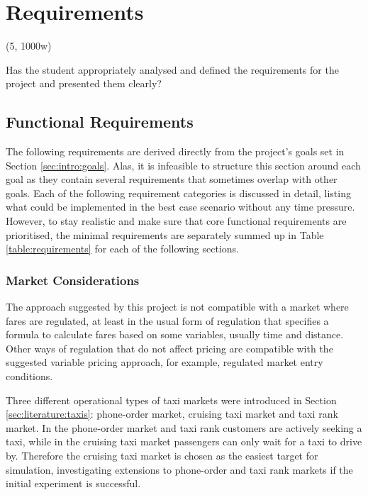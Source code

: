 \newpage
\section{Requirements}
\label{sec:requirements}

(5, 1000w)

Has the student appropriately analysed and defined the requirements for the
project and presented them clearly?


\subsection{Functional Requirements}
\label{sec:requirements:simulation}

The following requirements are derived directly from the project's goals set in
Section \ref{sec:intro:goals}. Alas, it is infeasible to structure this section
around each goal as they contain several requirements that sometimes overlap
with other goals. Each of the following requirement categories is discussed in
detail, listing what could be implemented in the best case scenario without any
time pressure. However, to stay realistic and make sure that core functional
requirements are prioritised, the minimal requirements are separately summed up
in Table \ref{table:requirements} for each of the following sections.


\subsubsection{Market Considerations}

The approach suggested by this project is not compatible with a market where
fares are regulated, at least in the usual form of regulation that specifies a
formula to calculate fares based on some variables, usually time and distance.
Other ways of regulation that do not affect pricing are compatible with the
suggested variable pricing approach, for example, regulated market entry
conditions.

Three different operational types of taxi markets were introduced in Section
\ref{sec:literature:taxis}: phone-order market, cruising taxi market and taxi
rank market. In the phone-order market and taxi rank customers are actively
seeking a taxi, while in the cruising taxi market passengers can only wait for
a taxi to drive by. Therefore the cruising taxi market is chosen as the easiest
target for simulation, investigating extensions to phone-order and taxi rank
markets if the initial experiment is successful.

